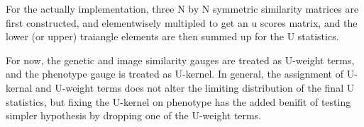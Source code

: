 \documentclass[twocolumn]{article}
\begin{document}
For the actually implementation, three N by N symmetric similarity matrices are first constructed, and elementwisely multipled to get an u scores matrix, and the lower (or upper) traiangle elements are then summed up for the U statistics.

For now, the genetic and image similarity gauges are treated as U-weight terms, and the phenotype gauge is treated as U-kernel. In general, the assignment of U-kernal and U-weight terms does not alter the limiting distribution of the final U statistics, but fixing the U-kernel on phenotype has the added benifit of testing simpler hypothesis by dropping one of the U-weight terms.

\end{document}
